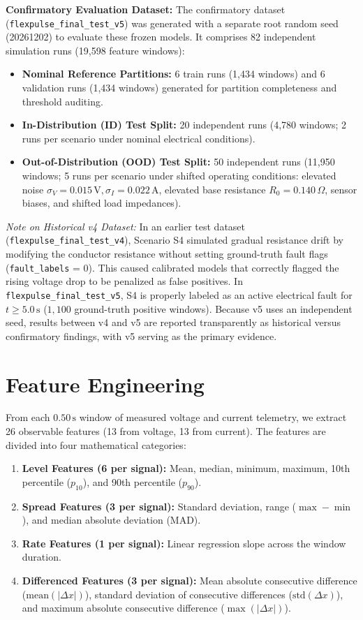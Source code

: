 \documentclass[conference]{IEEEtran}
\begin{document}
\textbf{Confirmatory Evaluation Dataset:} The confirmatory dataset (\texttt{flexpulse\_final\_test\_v5}) was generated with a separate root random seed (20261202) to evaluate these frozen models. It comprises 82 independent simulation runs (19,598 feature windows):
\begin{itemize}
    \item \textbf{Nominal Reference Partitions:} 6 train runs (1,434 windows) and 6 validation runs (1,434 windows) generated for partition completeness and threshold auditing.
    \item \textbf{In-Distribution (ID) Test Split:} 20 independent runs (4,780 windows; 2 runs per scenario under nominal electrical conditions).
    \item \textbf{Out-of-Distribution (OOD) Test Split:} 50 independent runs (11,950 windows; 5 runs per scenario under shifted operating conditions: elevated noise $\sigma_V=0.015\,\text{V}, \sigma_I=0.022\,\text{A}$, elevated base resistance $R_0=0.140\,\Omega$, sensor biases, and shifted load impedances).
\end{itemize}

\textit{Note on Historical v4 Dataset:} In an earlier test dataset (\texttt{flexpulse\_final\_test\_v4}), Scenario S4 simulated gradual resistance drift by modifying the conductor resistance without setting ground-truth fault flags (\texttt{fault\_labels} = 0). This caused calibrated models that correctly flagged the rising voltage drop to be penalized as false positives. In \texttt{flexpulse\_final\_test\_v5}, S4 is properly labeled as an active electrical fault for $t \ge 5.0\,\text{s}$ ($1,100$ ground-truth positive windows). Because v5 uses an independent seed, results between v4 and v5 are reported transparently as historical versus confirmatory findings, with v5 serving as the primary evidence.

\section{Feature Engineering}
From each $0.50\,\text{s}$ window of measured voltage and current telemetry, we extract 26 observable features (13 from voltage, 13 from current). The features are divided into four mathematical categories:
\begin{enumerate}
    \item \textbf{Level Features (6 per signal):} Mean, median, minimum, maximum, 10th percentile ($p_{10}$), and 90th percentile ($p_{90}$).
    \item \textbf{Spread Features (3 per signal):} Standard deviation, range ($\max - \min$), and median absolute deviation (MAD).
    \item \textbf{Rate Features (1 per signal):} Linear regression slope across the window duration.
    \item \textbf{Differenced Features (3 per signal):} Mean absolute consecutive difference ($\text{mean}(|\Delta x|)$), standard deviation of consecutive differences ($\text{std}(\Delta x)$), and maximum absolute consecutive difference ($\max(|\Delta x|)$).
\end{enumerate}
\end{document}
